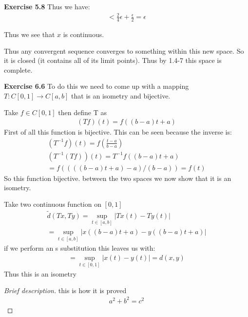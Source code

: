 \documentclass[12pt]{article}
\newenvironment{exercise}[1]{\vspace{.1in}\noindent\textbf{Exercise #1 \hspace{.05em}}}{}
\begin{document}
\begin{exercise}{5.8}
	Thus we have:
	\begin{align}
		< \frac{2}{4}\epsilon + \frac{\epsilon}{2}=\epsilon
	\end{align}

	Thus we see that $x$ is continuous.

	Thus any convergent sequence converges to something within this new space. So it is closed (it contains all of its limit points). Thus by 1.4-7 this space is complete.
\end{exercise}

\begin{exercise}{6.6}
	To do this we need to come up with a mapping $T:C[0,1]\rightarrow C[a,b]$ that is an isometry and bijective.

	Take $f\in C[0,1]$ then define T as
	\begin{align}
		(Tf)(t)= f((b-a)t+a)
	\end{align}
	First of all this function is bijective. This can be seen because the inverse is:
	\begin{align}
		(T^{-1}f)(t)=f(\frac{t-a}{b-a})    \\
		(T^{-1}(Tf))(t)=T^{-1} f((b-a)t+a) \\
		=f((((b-a)t+a)-a)/(b-a))= f(t)
	\end{align}
	So this function bijective. between the two spaces we now show that it is an isometry.

	Take two continuous function on $[0,1]$
	\begin{align}
		\tilde d (Tx,Ty)=\sup_{t\in [a,b]} |Tx(t)-Ty(t)| \\
		=\sup_{t\in [a,b]}|x((b-a)t+a)-y((b-a)t+a)|
	\end{align}
	if we perform an s substitution this leaves us with:
	\begin{align}
		=\sup_{t\in [0,1]}|x(t)-y(t)|=d(x,y)
	\end{align}
	Thus this is an isometry

	\begin{proof}[Brief description]
		this is how it is proved
		\begin{align}
			a^2+b^2=c^2
		\end{align}
	\end{proof}
\end{exercise}
\end{document}
